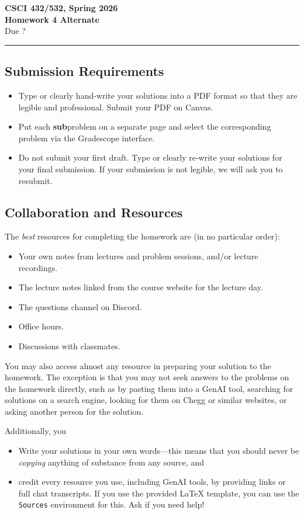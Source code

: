 \documentclass[11pt]{article}
\begin{document}
\begin{center}
\Large\textbf{CSCI 432/532, Spring 2026}%
\\
\LARGE\textbf{Homework 4 Alternate}%
\\[0.5ex]
\large Due ?
\end{center}

\bigskip
\hrule
\bigskip

\subsection*{Submission Requirements}
\begin{itemize}
    \item Type or clearly hand-write your solutions into a PDF format so that they are legible and professional. Submit your PDF on Canvas. 
	\item Put each \textbf{sub}problem on a separate page and select the corresponding problem via the Gradescope interface.
    \item Do not submit your first draft. Type or clearly re-write your solutions for your final submission. If your submission is not legible, we will ask you to resubmit.
\end{itemize}

\subsection*{Collaboration and Resources}

The \emph{best} resources for completing the homework are (in no particular order):
\begin{itemize}
	\item Your own notes from lectures and problem sessions, and/or lecture recordings.
	\item The lecture notes linked from the course website for the lecture day.
	\item The questions channel on Discord.
	\item Office hours.
	\item Discussions with classmates.
\end{itemize}
You may also access almost any resource in preparing your solution to the
homework. The exception is that you may not seek answers to the problems on the
homework directly, such as by pasting them into a GenAI tool, searching for
solutions on a search engine, looking for them on Chegg or similar websites, or
asking another person for the solution.

Additionally, you 
\begin{itemize}
    \item Write your solutions in your own words---this means that you should never be \emph{copying}
    anything of substance from any source, and
    \item credit every resource you use, including GenAI tools, by providing links or full chat transcripts.
    If you use the provided LaTeX template, you can use the \texttt{Sources}
    environment for this. Ask if you need help!
\end{itemize}
\end{document}
